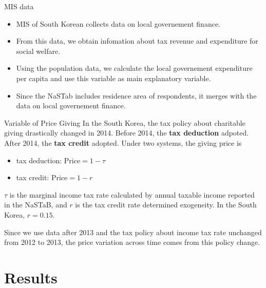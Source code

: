 \documentclass[
  ignorenonframetext,
]{beamer}
\providecommand{\tightlist}{%
  \setlength{\itemsep}{0pt}\setlength{\parskip}{0pt}}
\begin{document}
\begin{frame}{MIS data}
\protect\hypertarget{mis-data}{}
\begin{itemize}
\tightlist
\item
  MIS of South Korean collects data on local governement finance.
\item
  From this data, we obtain infomation about tax revenue and expenditure
  for social welfare.
\item
  Using the population data, we calculate the local governement
  expenditure per capita and use this variable as main explanatory
  variable.
\item
  Since the NaSTab includes residence area of respondents, it merges
  with the data on local governement finance.
\end{itemize}
\end{frame}

\begin{frame}{Variable of Price Giving}
\protect\hypertarget{variable-of-price-giving}{}
In the South Korea, the tax policy about charitable giving drastically
changed in 2014. Before 2014, the \textbf{tax deduction} adpoted. After
2014, the \textbf{tax credit} adopted. Under two systems, the giving
price is

\begin{itemize}
\tightlist
\item
  tax deduction: \(\text{Price} = 1 - \tau\)
\item
  tax credit: \(\text{Price} = 1 - r\)
\end{itemize}

\(\tau\) is the marginal income tax rate calculated by annual taxable
income reported in the NaSTaB, and \(r\) is the tax credit rate
determined exogeneity. In the South Korea, \(r = 0.15\).

Since we use data after 2013 and the tax policy about income tax rate
unchanged from 2012 to 2013, the price variation across time comes from
this policy change.
\end{frame}

\hypertarget{results}{%
\section{Results}\label{results}}
\end{document}

